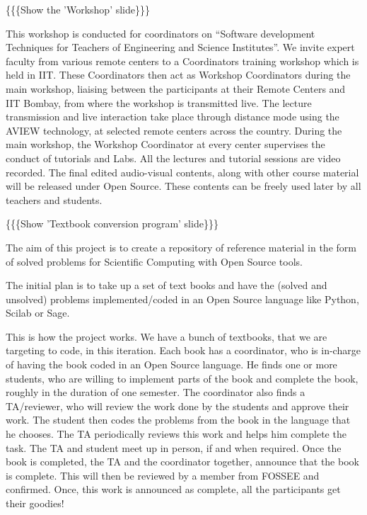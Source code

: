 \documentclass[a4paper,english]{article}
\begin{document}

\{\{\{Show the 'Workshop' slide\}\}\}


This workshop is conducted for coordinators on ``Software development Techniques for Teachers of Engineering and Science Institutes''.  We invite expert faculty from various remote centers to a Coordinators training workshop which is held in IIT. These Coordinators then act as Workshop Coordinators during the main workshop, liaising between the participants at their Remote Centers and IIT Bombay, from where the workshop is transmitted live. The lecture transmission and live interaction take place through distance mode using the AVIEW technology, at selected remote centers across the country. During the main workshop, the Workshop Coordinator at every center supervises the conduct of tutorials and Labs. All the lectures and tutorial sessions are video recorded. The final edited audio-visual contents, along with other course material will be released under Open Source. These contents can be freely used later by all teachers and students.


\{\{\{Show 'Textbook conversion program' slide\}\}\}


The aim of this project is to create a repository of reference material in the form of solved problems for Scientific Computing with Open Source tools.

The initial plan is to take up a set of text books and have the (solved and unsolved) problems implemented/coded in an Open Source language like Python, Scilab or Sage.

This is how the project works. We have a bunch of textbooks, that we are targeting to code, in this iteration. Each book has a coordinator, who is in-charge of having the book coded in an Open Source language. He finds one or more students, who are willing to implement parts of the book and complete the book, roughly in the duration of one semester. The coordinator also finds a TA/reviewer, who will review the work done by the students and approve their work. The student then codes the problems from the book in the language that he chooses. The TA periodically reviews this work and helps him complete the task. The TA and student meet up in person, if and when required. Once the book is completed, the TA and the coordinator together, announce that the book is complete. This will then be reviewed by a member from FOSSEE and confirmed. Once, this work is announced as complete, all the participants get their goodies!
\end{document}

